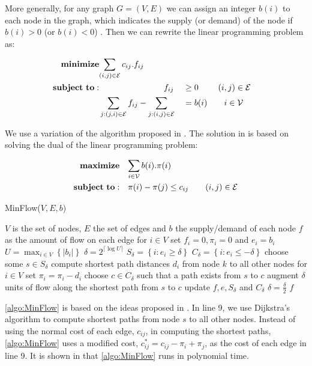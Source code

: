 More generally, for any graph $G = (V, E)$ we can assign an integer $b(i)$ to each node in the graph, which indicates the supply (or demand) of the node if $b(i) > 0$ (or $b(i) < 0$) . Then we can rewrite the linear programming problem as: 

\setcounter{equation}{0}
\begin{alignat}{2}
\mathbf{minimize}&\mathrlap{\sum_{(i,j) \in \mathcal{E}} c_{ij}.f_{ij}} \notag\\
\mathbf{subject\ to:}&\phantom{{a}={a}{a}={a}{a}={a}{a}} f_{ij} && \geq 0 \ \quad\quad (i,j) \in \mathcal{E}\\
&\sum_{j:(j,i) \in \mathcal{E}} f_{ij} - \sum_{j:(i,j) \in \mathcal{E}} &&= b(i) \quad\quad i \in \mathcal{V}
\end{alignat}

We use a variation of the algorithm proposed in \cite{Edmonds72}. The solution in \cite{Edmonds72} is based on solving the dual of the linear programming problem:

\setcounter{equation}{0}
\begin{alignat}{2}
\mathbf{maximize}&\quad\mathrlap{\sum_{i \in \mathcal{V}} b(i).\pi(i)} \notag\\
\mathbf{subject\ to:}&\quad\pi(i) - \pi(j) \leq c_{ij} \quad\quad (i,j) \in \mathcal{E}
\end{alignat}

\begin{algorithm}[t]
\caption{MinFlow($V, E, b$)}
\label{algo:MinFlow}
\begin{algorithmic}[1]
\REQUIRE $V$ is the set of nodes, $E$ the set of edges and $b$ the supply/demand of each node
\ENSURE $f$ as the amount of flow on each edge
\STATE for $i \in V$ set $f_i = 0, \pi_i =0$ and $e_i = b_i$
\STATE $U = \max_{i \in V} \left\lbrace\vert b_i\vert \right\rbrace$
\STATE $\delta = 2^{ \lceil \log U \rceil }$
   \STATE $S_{\delta} = \left\lbrace i : e_i \geq \delta \right\rbrace$
   \STATE $C_{\delta} = \left\lbrace i : e_i \leq -\delta \right\rbrace$
     \STATE choose some $s \in S_{\delta}$
     \STATE compute shortest path distances $d_i$ from node $k$ to all other nodes
     \STATE for $i \in V$ set $\pi_i = \pi_i - d_i$
     \STATE choose $c \in C_{\delta}$ such that a path exists from $s$ to $c$
     \STATE augment $\delta$ units of flow along the shortest path from $s$ to $c$
     \STATE update $f, e, S_{\delta}$ and $C_{\delta}$
   \ENDWHILE
   \STATE $\delta = \frac{\delta}{2}$ 
\ENDWHILE
\RETURN $f$
\end{algorithmic}
\end{algorithm}

\cref{algo:MinFlow} is based on the ideas proposed in \cite{Edmonds72}. In line 9, we use Dijkstra's algorithm to compute shortest paths from node $s$ to all other nodes. Instead of using the normal cost of each edge, $c_{ij}$, in computing the shortest paths, \cref{algo:MinFlow} uses a modified cost, $c_{ij}^{*} = c_{ij} - \pi_i + \pi_j$, as the cost of each edge in line 9. It is shown in \cite{Edmonds72} that \cref{algo:MinFlow} runs in polynomial time.